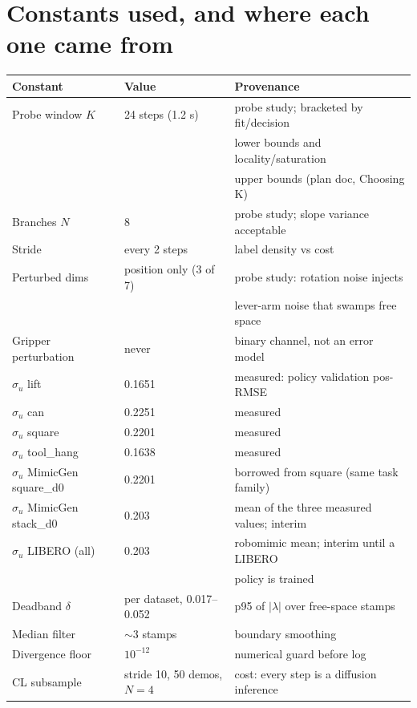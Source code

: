 \documentclass[11pt]{article}
\begin{document}
\section{Constants used, and where each one came from}

\begin{center}
\begin{tabular}{@{}lll@{}}
\toprule
Constant & Value & Provenance \\
\midrule
Probe window $K$ & 24 steps (1.2 s) & probe study; bracketed by fit/decision \\
 & & lower bounds and locality/saturation \\
 & & upper bounds (plan doc, Choosing K) \\
Branches $N$ & 8 & probe study; slope variance acceptable \\
Stride & every 2 steps & label density vs cost \\
Perturbed dims & position only (3 of 7) & probe study: rotation noise injects \\
 & & lever-arm noise that swamps free space \\
Gripper perturbation & never & binary channel, not an error model \\
$\sigma_u$ lift & 0.1651 & measured: policy validation pos-RMSE \\
$\sigma_u$ can & 0.2251 & measured \\
$\sigma_u$ square & 0.2201 & measured \\
$\sigma_u$ tool\_hang & 0.1638 & measured \\
$\sigma_u$ MimicGen square\_d0 & 0.2201 & borrowed from square (same task family) \\
$\sigma_u$ MimicGen stack\_d0 & 0.203 & mean of the three measured values; interim \\
$\sigma_u$ LIBERO (all) & 0.203 & robomimic mean; interim until a LIBERO \\
 & & policy is trained \\
Deadband $\delta$ & per dataset, 0.017--0.052 & p95 of $|\lambda|$ over free-space stamps \\
Median filter & $\sim$3 stamps & boundary smoothing \\
Divergence floor & $10^{-12}$ & numerical guard before log \\
CL subsample & stride 10, 50 demos, $N{=}4$ & cost: every step is a diffusion inference \\
\bottomrule
\end{tabular}
\end{center}
\end{document}
